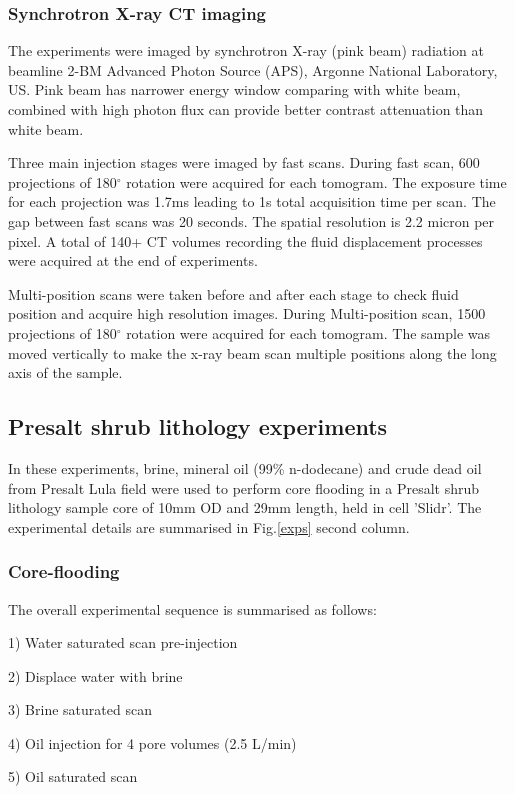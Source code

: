 \subsubsection{Synchrotron X-ray \textmu CT imaging}
The experiments were imaged by synchrotron X-ray (pink beam) radiation at beamline 2-BM Advanced Photon Source (APS), Argonne National Laboratory, US. Pink beam has narrower energy window comparing with white beam, combined with high photon flux can provide better contrast attenuation than white beam.

Three main injection stages were imaged by fast scans. During fast scan, 600 projections of 180$^{\circ}$ rotation were acquired for each tomogram. The exposure time for each projection was 1.7ms leading to 1s total acquisition time per scan. The gap between fast scans was 20 seconds. The spatial resolution is 2.2 micron per pixel. A total of 140+ CT volumes recording the fluid displacement processes were acquired at the end of experiments.

Multi-position scans were taken before and after each stage to check fluid position and acquire high resolution images. During Multi-position scan, 1500 projections of 180$^{\circ}$ rotation were acquired for each tomogram. The sample was moved vertically to make the x-ray beam scan multiple positions along the long axis of the sample.


\subsection{Presalt shrub lithology experiments}
In these experiments, brine, mineral oil (99\% n-dodecane) and crude dead oil from Presalt Lula field were used to perform core flooding in a Presalt shrub lithology sample core of 10mm OD and 29mm length, held in cell 'Slidr'. The experimental details are summarised in Fig.\ref{exps} second column.

\subsubsection{Core-flooding}
The overall experimental sequence is summarised as follows: 

1) Water saturated scan pre-injection

2) Displace water with brine 

3) Brine saturated scan 

4) Oil injection for 4 pore volumes (2.5 \textmu L/min) 

5) Oil saturated scan 

